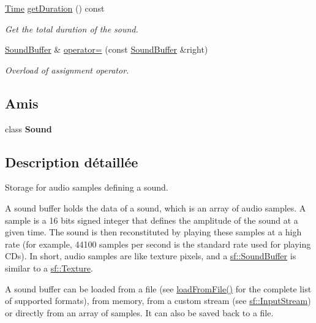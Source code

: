 \begin{DoxyCompactItemize}
\hyperlink{classsf_1_1Time}{Time} \hyperlink{classsf_1_1SoundBuffer_a280a581d9b360fd16121714c51fc8261}{get\+Duration} () const
\begin{DoxyCompactList}\small\item\em Get the total duration of the sound. \end{DoxyCompactList}\item 
\hyperlink{classsf_1_1SoundBuffer}{Sound\+Buffer} \& \hyperlink{classsf_1_1SoundBuffer_adcc786b60bbd95be1551368fafd274a7}{operator=} (const \hyperlink{classsf_1_1SoundBuffer}{Sound\+Buffer} \&right)
\begin{DoxyCompactList}\small\item\em Overload of assignment operator. \end{DoxyCompactList}\end{DoxyCompactItemize}
\subsection*{Amis}
\begin{DoxyCompactItemize}
\item 
\mbox{\label{classsf_1_1SoundBuffer_a50914f77c7cf4fb97616c898c5291f4b}} 
class {\bfseries Sound}
\end{DoxyCompactItemize}


\subsection{Description détaillée}
Storage for audio samples defining a sound. 

A sound buffer holds the data of a sound, which is an array of audio samples. A sample is a 16 bits signed integer that defines the amplitude of the sound at a given time. The sound is then reconstituted by playing these samples at a high rate (for example, 44100 samples per second is the standard rate used for playing C\+Ds). In short, audio samples are like texture pixels, and a \hyperlink{classsf_1_1SoundBuffer}{sf\+::\+Sound\+Buffer} is similar to a \hyperlink{classsf_1_1Texture}{sf\+::\+Texture}.

A sound buffer can be loaded from a file (see \hyperlink{classsf_1_1SoundBuffer_a2be6a8025c97eb622a7dff6cf2594394}{load\+From\+File()} for the complete list of supported formats), from memory, from a custom stream (see \hyperlink{classsf_1_1InputStream}{sf\+::\+Input\+Stream}) or directly from an array of samples. It can also be saved back to a file.

